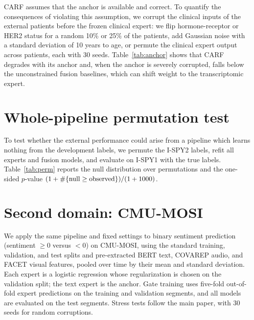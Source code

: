 \documentclass[runningheads]{llncs}
\begin{document}
CARF assumes that the anchor is available and correct. To quantify the consequences of violating this assumption, we corrupt the clinical inputs of the external patients before the frozen clinical expert: we flip hormone-receptor or HER2 status for a random 10\% or 25\% of the patients, add Gaussian noise with a standard deviation of 10 years to age, or permute the clinical expert output across patients, each with 30 seeds. Table~\ref{tab:anchor} shows that CARF degrades with its anchor and, when the anchor is severely corrupted, falls below the unconstrained fusion baselines, which can shift weight to the transcriptomic expert.

\begin{table}[h]
\centering
\caption{External AUROC (mean $\pm$ SD over 30 realizations) when the clinical anchor is corrupted.}
\label{tab:anchor}
\small
{}
\end{table}

\section{Whole-pipeline permutation test}

To test whether the external performance could arise from a pipeline which learns nothing from the development labels, we permute the I-SPY2 labels, refit all experts and fusion models, and evaluate on I-SPY1 with the true labels. Table~\ref{tab:perm} reports the null distribution over \NPerm{} permutations and the one-sided $p$-value $(1+\#\{\text{null}\ge\text{observed}\})/(1+1000)$.

\begin{table}[h]
\centering
\caption{Whole-pipeline label-permutation test (\NPerm{} permutations).}
\label{tab:perm}
\small
{}
\end{table}

\section{Second domain: CMU-MOSI}

We apply the same pipeline and fixed settings to binary sentiment prediction (sentiment $\ge0$ versus $<0$) on CMU-MOSI, using the standard training, validation, and test splits and pre-extracted BERT text, COVAREP audio, and FACET visual features, pooled over time by their mean and standard deviation. Each expert is a logistic regression whose regularization is chosen on the validation split; the text expert is the anchor. Gate training uses five-fold out-of-fold expert predictions on the training and validation segments, and all models are evaluated on the \MosiN{} test segments. Stress tests follow the main paper, with 30 seeds for random corruptions.
\end{document}
